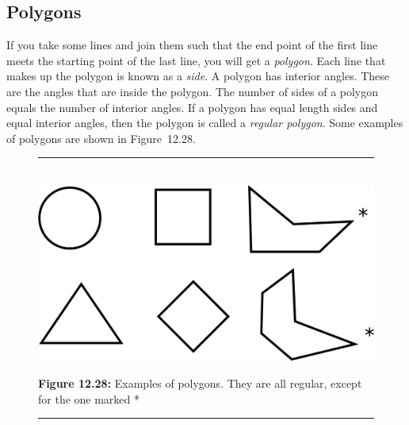             \subsection{ Polygons}
            \nopagebreak
      \label{m39368*id317435}If you take some lines and join them such that the end point of the first line meets the starting point of the last line, you will get a \textsl{polygon}. Each line that makes up the polygon is known as a \textsl{side}. A polygon has interior angles. These are the angles that are inside the polygon. The number of sides of a polygon equals the number of interior angles. If a polygon has equal length sides and equal interior angles, then the polygon is called a \textsl{regular polygon}. Some examples of polygons are shown in Figure~12.28.\par 
    \setcounter{subfigure}{0}
	\begin{figure}[H] %
    \begin{center}
    \rule[.1in]{\figurerulewidth}{.005in} \\
        \label{m39368*uid37!!!underscore!!!media}\label{m39368*uid37!!!underscore!!!printimage}\includegraphics{col11306.imgs/m39368_MG10C13_0221.png} %
      \vspace{2pt}
    \vspace{\rubberspace}\par \begin{cnxcaption}
	  \small \textbf{Figure 12.28: }Examples of polygons. They are all regular, except for the one marked *
	\end{cnxcaption}
    \vspace{.1in}
    \rule[.1in]{\figurerulewidth}{.005in} \\
    \end{center}
 \end{figure}       
      \label{m39368*uid38}
